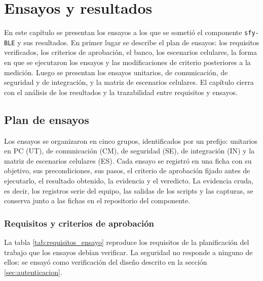 \chapter{Ensayos y resultados}
\label{Chapter4}

En este capítulo se presentan los ensayos a los que se sometió el componente \texttt{sfy-BLE} y sus resultados. En primer lugar se describe el plan de ensayos: los requisitos verificados, los criterios de aprobación, el banco, los escenarios celulares, la forma en que se ejecutaron los ensayos y las modificaciones de criterio posteriores a la medición. Luego se presentan los ensayos unitarios, de comunicación, de seguridad y de integración, y la matriz de escenarios celulares. El capítulo cierra con el análisis de los resultados y la trazabilidad entre requisitos y ensayos.


\section{Plan de ensayos}
\label{sec:plan_ensayos}

Los ensayos se organizaron en cinco grupos, identificados por un prefijo: unitarios en PC (UT), de comunicación (CM), de seguridad (SE), de integración (IN) y la matriz de escenarios celulares (ES). Cada ensayo se registró en una ficha con su objetivo, sus precondiciones, sus pasos, el criterio de aprobación fijado antes de ejecutarlo, el resultado obtenido, la evidencia y el veredicto. La evidencia cruda, es decir, los registros serie del equipo, las salidas de los scripts y las capturas, se conserva junto a las fichas en el repositorio del componente.

\subsection{Requisitos y criterios de aprobación}
\label{subsec:ensayos_requisitos}

La tabla \ref{tab:requisitos_ensayo} reproduce los requisitos de la planificación del trabajo que los ensayos debían verificar. La seguridad no responde a ninguno de ellos: se ensayó como verificación del diseño descrito en la sección \ref{sec:autenticacion}.


